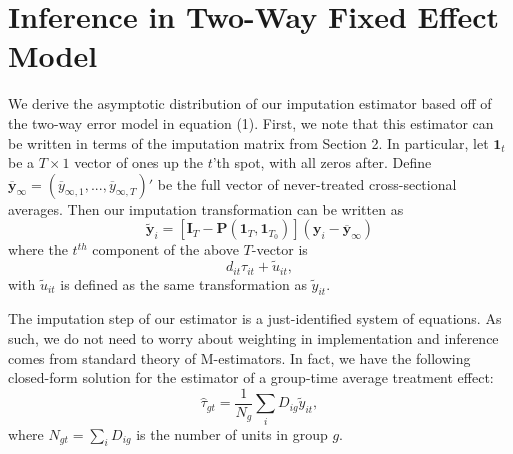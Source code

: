 \documentclass[12pt]{article}
\begin{document}
\section{Inference in Two-Way Fixed Effect Model}\label{sec:twfe_inference}

We derive the asymptotic distribution of our imputation estimator based off of the two-way error model in equation (1). First, we note that this estimator can be written in terms of the imputation matrix from Section 2. In particular, let $\bm 1_t$ be a $T \times 1$ vector of ones up the $t$'th spot, with all zeros after. Define $\overline{\bm y}_{\infty} = (\overline{y}_{\infty, 1},..., \overline{y}_{\infty, T})'$ be the full vector of never-treated cross-sectional averages. Then our imputation transformation can be written as 
\begin{equation}
    \tilde{\bm y}_i = \left[ \bm I_T - \bm P(\bm 1_T, \bm 1_{T_0}) \right] (\bm y_i - \overline{\bm y}_{\infty})
\end{equation}
where the $t^{th}$ component of the above $T$-vector is 
\begin{equation}
    d_{it} \tau_{it} + \tilde{u}_{it},
\end{equation}
with $\tilde{u}_{it}$ is defined as the same transformation as $\tilde{y}_{it}$.

The imputation step of our estimator is a just-identified system of equations. As such, we do not need to worry about weighting in implementation and inference comes from standard theory of M-estimators. In fact, we have the following closed-form solution for the estimator of a group-time average treatment effect: 
\begin{equation}
    \widehat{\tau}_{gt} = \frac{1}{N_{g}}\sum_{i} D_{ig} \tilde{y}_{it},
\end{equation}
where $N_{gt} = \sum_i D_{ig}$ is the number of units in group $g$. 
\end{document}
